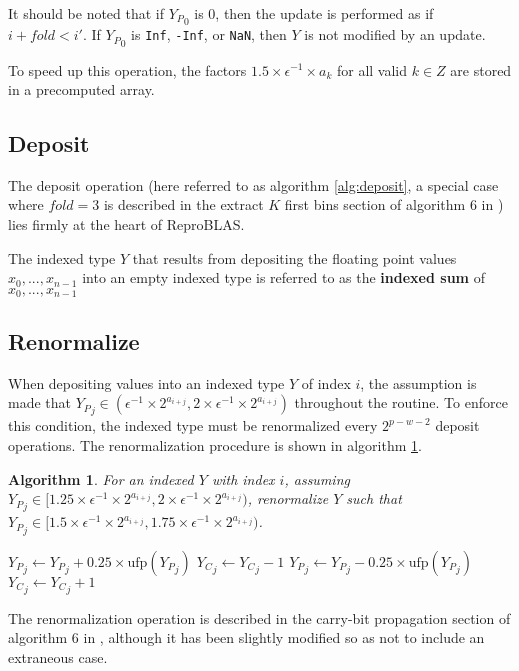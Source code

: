 \documentclass[12pt]{article}
\providecommand{\ufp}{\ensuremath{\text{ufp}}}
\theoremstyle{plain}
\newtheorem{alg}{Algorithm}[section]
\begin{document}
    It should be noted that if ${Y_P}_0$ is 0, then the update is performed as if $i + fold < i'$. If ${Y_P}_0$ is \verb|Inf|, \verb|-Inf|, or \verb|NaN|, then $Y$ is not modified by an update.

    To speed up this operation, the factors $1.5 \times \epsilon^{-1} \times a_k$ for all valid $k \in Z$ are stored in a precomputed array.

  \subsection{Deposit}
    The deposit operation (here referred to as algorithm \ref{alg:deposit}, a special case where $fold = 3$ is described in the extract $K$ first bins section of algorithm $6$ in \cite{repsum}) lies firmly at the heart of ReproBLAS.

    The indexed type $Y$ that results from depositing the floating point values $x_0, ..., x_{n - 1}$ into an empty indexed type is referred to as the \textbf{indexed sum} of $x_0, ..., x_{n - 1}$

  \subsection{Renormalize}
    \label{sec:renormalize}
    When depositing values into an indexed type $Y$ of index $i$, the assumption is made that ${Y_P}_j \in (\epsilon^{-1}\times 2^{a_{i + j}}, 2 \times \epsilon^{-1}\times 2^{a_{i + j}})$ throughout the routine. To enforce this condition, the indexed type must be renormalized every $2^{p - w - 2}$ deposit operations. The renormalization procedure is shown in algorithm \ref{alg:renorm}.
    \begin{alg}
      For an indexed $Y$ with index $i$, assuming ${Y_P}_j \in [1.25 \times \epsilon^{-1}\times 2^{a_{i + j}}, 2 \times \epsilon^{-1}\times 2^{a_{i + j}})$, renormalize $Y$ such that ${Y_P}_j \in [1.5 \times \epsilon^{-1}\times 2^{a_{i + j}}, 1.75 \times \epsilon^{-1}\times 2^{a_{i + j}})$.
      \begin{algorithmic}
            \If{${Y_P}_j < 1.5 \times \ufp({Y_P}_j)$}
              \State ${Y_P}_j \gets {Y_P}_j + 0.25 \times \ufp({Y_P}_j)$
              \State ${Y_C}_j \gets {Y_C}_j - 1$
            \EndIf
            \If{${Y_P}_j \geq 1.75 \times \ufp({Y_P}_j)$}
              \State ${Y_P}_j \gets {Y_P}_j - 0.25 \times \ufp({Y_P}_j)$
              \State ${Y_C}_j \gets {Y_C}_j + 1$
            \EndIf
          \EndFor
        \EndFunction
      \end{algorithmic}
      \label{alg:renorm}
    \end{alg}
    The renormalization operation is described in the carry-bit propagation section of algorithm $6$ in \cite{repsum}, although it has been slightly modified so as not to include an extraneous case.
\end{document}

